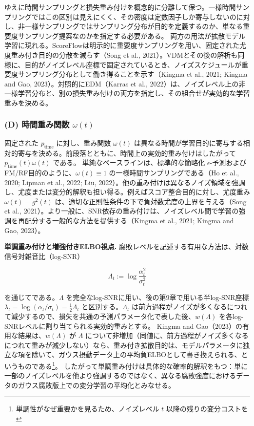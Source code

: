 ゆえに時間サンプリングと損失重み付けを概念的に分離して保つ。一様時間サンプリングではこの区別は見えにくく、その密度は定数因子しか寄与しないのに対し、非一様サンプリングではサンプリング分布が目的を定義するのか、単なる重要度サンプリング提案なのかを指定する必要がある。
両方の用法が拡散モデル学習に現れる。ScoreFlowは明示的に重要度サンプリングを用い、固定された尤度重み付き目的の分散を減らす（Song et al., 2021）。VDMとその後の解析も同様に、目的がノイズレベル座標で固定されているとき、ノイズスケジュールが重要度サンプリング分布として働き得ることを示す（Kingma et al., 2021; Kingma and Gao, 2023）。対照的にEDM（Karras et al., 2022）は、ノイズレベル上の非一様学習分布と、別の損失重み付けの両方を指定し、その組合せが実効的な学習重みを決める。

\subsubsection*{(D) 時間重み関数 $\omega(t)$}


固定された $p_{\mathrm{time}}$ に対し、重み関数 $\omega(t)$ は異なる時間が学習目的に寄与する相対的寄与を決める。前段落とともに、時間上の実効的重み付けはしたがって $p_{\mathrm{time}}(t)\omega(t)$ である。
単純なベースラインは、標準的な簡略化 $\epsilon$-予測およびFM/RF目的のように、$\omega(t)\equiv 1$ の一様時間サンプリングである（Ho et al., 2020; Lipman et al., 2022; Liu, 2022）。他の重み付けは異なるノイズ領域を強調し、尤度または変分的解釈も担い得る。例えばスコア整合目的に対し、尤度重み $\omega(t) = g^2(t)$ は、適切な正則性条件の下で負対数尤度の上界を与える（Song et al., 2021）。より一般に、SNR依存の重み付けは、ノイズレベル間で学習の強調を再配分する一般的な方法を提供する（Kingma et al., 2021; Kingma and Gao, 2023）。

\textbf{単調重み付けと増強付きELBO視点.} 腐敗レベルを記述する有用な方法は、対数信号対雑音比（log-SNR）

\[
\Lambda_t := \log\frac{\alpha_t^2}{\sigma_t^2}
\]


を通じてである。$\Lambda$ を完全なlog-SNRに用い、後の第9章で用いる半log-SNR座標 $\lambda_t = \log(\alpha_t/\sigma_t) = \tfrac{1}{2}\Lambda_t$ と区別する。$\Lambda_t$ は前方過程がノイズが多くなるにつれて減少するので、損失を共通の予測パラメータ化で表した後、$w(\Lambda)$ を各log-SNRレベルに割り当てられる実効的重みとする。
Kingma and Gao（2023）の有用な結果は、$w(\Lambda)$ が $\Lambda$ について非増加（同値に、前方過程がノイズ多くなるにつれて重みが減少しない）なら、重み付き拡散目的は、モデルパラメータに独立な項を除いて、ガウス摂動データ上の平均負ELBOとして書き換えられる、というものである\footnote{単調性がなぜ重要かを見るため、ノイズレベル $t$ 以降の残りの変分コストを}。
したがって単調重み付けは具体的な確率的解釈をもつ：単に一部のノイズレベルを他より強調するのではなく、異なる腐敗強度におけるデータのガウス腐敗版上での変分学習の平均化とみなせる。

